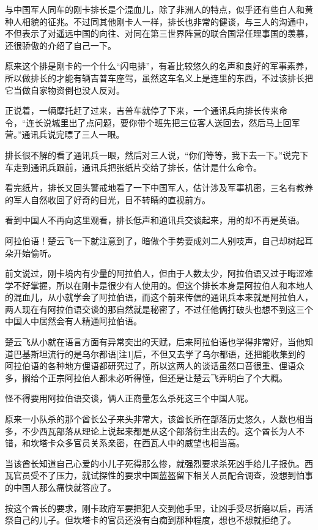 与中国军人同车的刚卡排长是个混血儿，除了非洲人的特点，似乎还有些白人和黄种人相貌的征兆。不过同其他刚卡人一样，排长也非常的健谈，与三人的沟通中，不但表示了对遥远中国的向往、对同在第三世界阵营的联合国常任理事国的羡慕，还很骄傲的介绍了自己一下。

原来这个排是刚卡的一个什么“闪电排”，有着比较悠久的名声和良好的军事素养，所以做排长的才能有辆吉普车座驾，虽然这车名义上是连里的东西，不过该排长把它当做自家物资倒也没人反对。

正说着，一辆摩托赶了过来，吉普车就停了下来，一个通讯兵向排长传来命令，“连长说城里出了点问题，要你带个班先把三位客人送回去，然后马上回军营。”通讯兵说完瞟了三人一眼。

排长很不解的看了通讯兵一眼，然后对三人说，“你们等等，我下去一下。”说完下车走到通讯兵跟前，通讯兵把张纸片交给了排长，估计是什么命令。

看完纸片，排长又回头警戒地看了一下中国军人，估计涉及军事机密，三名有教养的军人自然收回了好奇的目光，目不转睛的直视前方。

看到中国人不再向这里观看，排长低声和通讯兵交谈起来，用的却不再是英语。

阿拉伯语！楚云飞一下就注意到了，暗做个手势要成刘二人别吱声，自己却树起耳朵开始偷听。

前文说过，刚卡境内有少量的阿拉伯人，但由于人数太少，阿拉伯语又过于晦涩难学不好掌握，所以在刚卡是很少有人使用的。但这个排长本身是阿拉伯人和本地人的混血儿，从小就学会了阿拉伯语，而这个前来传信的通讯兵本来就是阿拉伯人，两人现在有阿拉伯语交谈的那自然就是秘密了，不过任他俩打破头也想不到这三个中国人中居然会有人精通阿拉伯语。

楚云飞从小就在语言方面有异常突出的天赋，后来阿拉伯语也学得非常好，当他知道巴基斯坦流行的是乌尔都语[注1]后，不但又去学了乌尔都语，还把能收集到的阿拉伯语的各种地方俚语都研究过了，所以这两人的谈话虽然口音很重、俚语众多，搁给个正宗阿拉伯人都未必听得懂，但还是让楚云飞弄明白了个大概。

怪不得要用阿拉伯语交谈，俩人正商量怎么杀死这三个中国人呢。

原来一小队杀的那个酋长公子来头非常大，该酋长所在部落历史悠久，人数也相当多，不少西瓦部落从理论上说起来都是从这个部落衍生出去的。这个酋长为人不错，和坎塔卡众多官员关系亲密，在西瓦人中的威望也相当高。

当该酋长知道自己心爱的小儿子死得那么惨，就强烈要求杀死凶手给儿子报仇。西瓦官员受不了压力，就试探性的要求中国蓝盔留下相关人员配合调查，没想到怕事的中国人那么痛快就答应了。

按这个酋长的要求，刚卡政府军要把犯人交到他手里，让凶手受尽折磨以后，再活祭自己的儿子。但坎塔卡的官员还没有白痴到那种程度，想也不想就拒绝了。

